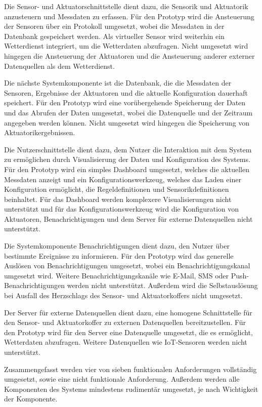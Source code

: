 Die Sensor- und Aktuatorschnittstelle dient dazu, die Sensorik und Aktuatorik anzusteuern und Messdaten zu erfassen.
Für den Prototyp wird die Ansteuerung der Sensoren über ein Protokoll umgesetzt, wobei die Messdaten in der Datenbank gespeichert werden.
Als virtueller Sensor wird weiterhin ein Wetterdienst integriert, um die Wetterdaten abzufragen.
Nicht umgesetzt wird hingegen die Ansteuerung der Aktuatoren und die Ansteuerung anderer externer Datenquellen als dem Wetterdienst.

Die nächste Systemkomponente ist die Datenbank, die die Messdaten der Sensoren, Ergebnisse der Aktuatoren und die aktuelle Konfiguration dauerhaft speichert.
Für den Prototyp wird eine vorübergehende Speicherung der Daten und das Abrufen der Daten umgesetzt, wobei die Datenquelle und der Zeitraum angegeben werden können.
Nicht umgesetzt wird hingegen die Speicherung von Aktuatorikergebnissen.

Die Nutzerschnittstelle dient dazu, dem Nutzer die Interaktion mit dem System zu ermöglichen durch Visualisierung der Daten und Konfiguration des Systems.
Für den Prototyp wird ein simples Dashboard umgesetzt, welches die aktuellen Messdaten anzeigt und ein Konfigurationswerkzeug, welches das Laden einer Konfiguration ermöglicht, die Regeldefinitionen und Sensorikdefinitionen beinhaltet.
Für das Dashboard werden komplexere Visualisierungen nicht unterstützt und für das Konfigurationswerkzeug wird die Konfiguration von Aktuatoren, Benachrichtigungen und dem Server für externe Datenquellen nicht unterstützt.

Die Systemkomponente Benachrichtigungen dient dazu, den Nutzer über bestimmte Ereignisse zu informieren.
Für den Prototyp wird das generelle Auslösen von Benachrichtigungen umgesetzt, wobei ein Benachrichtigungskanal umgesetzt wird.
Weitere Benachrichtigungskanäle wie E-Mail, SMS oder Push-Benachrichtigungen werden nicht unterstützt.
Außerdem wird die Selbstauslösung bei Ausfall des Herzschlags des Sensor- und Aktuatorkoffers nicht umgesetzt.

Der Server für externe Datenquellen dient dazu, eine homogene Schnittstelle für den Sensor- und Aktuatorkoffer zu externen Datenquellen bereitzustellen.
Für den Prototyp wird für den Server eine Datenquelle umgesetzt, die es ermöglicht, Wetterdaten abzufragen.
Weitere Datenquellen wie IoT-Sensoren werden nicht unterstützt.

Zusammengefasst werden vier von sieben funktionalen Anforderungen vollständig umgesetzt, sowie eine nicht funktionale Anforderung.
Außerdem werden alle Komponenten des Systems mindestens rudimentär umgesetzt, je nach Wichtigkeit der Komponente.



